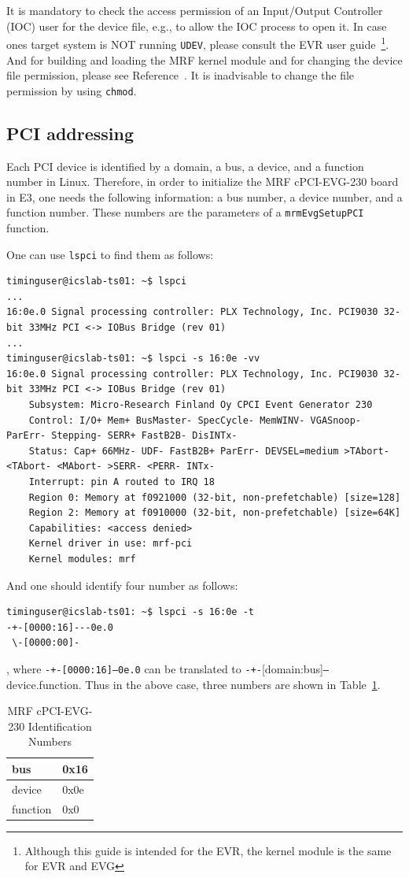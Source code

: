 \documentclass[11pt
  , a4paper
  , article
  , oneside
  , showtrims
]{memoir}
\begin{document}
It is mandatory to check the access permission of an Input/Output Controller (IOC) user for the device file, e.g.,  to allow the IOC process to open it. In case ones target system is NOT running \texttt{UDEV}, please consult the EVR user guide~\cite{EVR-USER-GUIDE}\footnote{Although this guide is intended for the EVR, the kernel module is the same for EVR and EVG}. And for building and loading the MRF kernel module and for changing the device file permission, please see Reference~\citep[see][p12,13]{EVR-USER-GUIDE}. It is inadvisable to change the file permission by using \texttt{chmod}.

\subsection{PCI addressing}
Each PCI device is identified by a domain, a bus, a device, and a function number in Linux. Therefore, in order to initialize the MRF cPCI-EVG-230 board in E3, one needs the following information: a bus number, a device number, and a function number. These numbers are the parameters of a \texttt{mrmEvgSetupPCI} function.

One can use \texttt{lspci} to find them as follows:
\begin{lstlisting}[style=termstyle]
timinguser@icslab-ts01: ~$ lspci
...
16:0e.0 Signal processing controller: PLX Technology, Inc. PCI9030 32-bit 33MHz PCI <-> IOBus Bridge (rev 01)
...
timinguser@icslab-ts01: ~$ lspci -s 16:0e -vv
16:0e.0 Signal processing controller: PLX Technology, Inc. PCI9030 32-bit 33MHz PCI <-> IOBus Bridge (rev 01)
	Subsystem: Micro-Research Finland Oy CPCI Event Generator 230
	Control: I/O+ Mem+ BusMaster- SpecCycle- MemWINV- VGASnoop- ParErr- Stepping- SERR+ FastB2B- DisINTx-
	Status: Cap+ 66MHz- UDF- FastB2B+ ParErr- DEVSEL=medium >TAbort- <TAbort- <MAbort- >SERR- <PERR- INTx-
	Interrupt: pin A routed to IRQ 18
	Region 0: Memory at f0921000 (32-bit, non-prefetchable) [size=128]
	Region 2: Memory at f0910000 (32-bit, non-prefetchable) [size=64K]
	Capabilities: <access denied>
	Kernel driver in use: mrf-pci
	Kernel modules: mrf

\end{lstlisting}

And one should identify four number as follows:
\begin{lstlisting}[style=termstyle]
timinguser@icslab-ts01: ~$ lspci -s 16:0e -t
-+-[0000:16]---0e.0
 \-[0000:00]-

\end{lstlisting}
, where \texttt{-+-[0000:16]---0e.0} can be translated to \texttt{-+-}[domain:bus]\texttt{---}device.function. Thus in the above case, three numbers are shown in Table~\ref{table:pciidnumber}.\begin{table}[!htb]
  \centering
  \begin{tabular}{l|l}
    \toprule
    bus      & 0x16 \\\midrule
    device   & 0x0e \\\midrule
    function & 0x0 \\\bottomrule
  \end{tabular}
  \caption[]{MRF cPCI-EVG-230 Identification Numbers}
  \label{table:pciidnumber}
\end{table}
\end{document}
